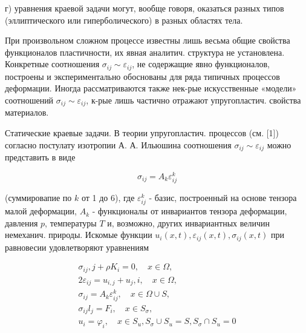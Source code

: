 \documentclass[10pt]{article}
\begin{document}
г) уравнения краевой задачи могут, вообще говоря, оказаться разных типов (эллиптического или гиперболического) в разных областях тела.



При произвольном сложном процессе известны лишь весьма общие свойства функционалов пластичности, их явная аналитич. структура не установлена. Конкретные соотношения $\sigma_{i j} \sim \varepsilon_{i j}$, не содержащие явно функционалов, построены и экспериментально обоснованы для ряда типичных процессов деформации. Иногда рассматриваются также нек-рые искусственные «модели» соотношений $\sigma_{i j} \sim \varepsilon_{i j}$, к-рые лишь частично отражают упругопластич. свойства материалов.



Статические краевые задачи. В теории упругопластич. процессов (см. [1]) согласно постулату изотропии А. А. Ильюшина соотношения $\sigma_{i j} \sim \varepsilon_{i j}$ можно представить в виде



\[

\sigma_{i j}=A_{k} \varepsilon_{i j}^{k}

\]



(суммировапие по $k$ от 1 до 6), где $\varepsilon_{i j}^{k}$ - базис, построенный на основе тензора малой деформации, $A_{k}$ - функционалы от инвариантов тензора деформации, давления $p$, температуры $T$ и, возможно, других инвариантных величин немеханич. природы. Искомые функции $u_{i}(x, t), \varepsilon_{i j}(x, t), \sigma_{i j}(x, t)$ при равновесии удовлетворяют уравнениям



\[

\begin{gathered}

\sigma_{i j}, j+\rho K_{i}=0, \quad x \in \Omega, \\

2 \varepsilon_{i j}=u_{i, j}+u_{j}, i, \quad x \in \Omega, \\

\sigma_{i j}=A_{k} \varepsilon_{i j}^{k}, \quad x \in \Omega \cup S, \\

\sigma_{i j} l_{j}=F_{i}, \quad x \in S_{\sigma}, \\

u_{i}=\varphi_{i}, \quad x \in S_{u}, S_{\sigma} \cup S_{u}=S, S_{\sigma} \cap S_{u}=0

\end{gathered}

\]
\end{document}

